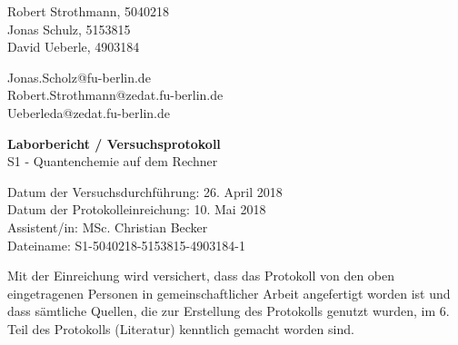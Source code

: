 %


%
\thispagestyle{empty}

\begin{flushleft}
Robert Strothmann, 5040218\\ 
Jonas Schulz, 5153815\\ 
David Ueberle, 4903184\\ 
\end{flushleft}
\vspace*{0.3cm}
Jonas.Scholz@fu-berlin.de\\
Robert.Strothmann@zedat.fu-berlin.de\\
Ueberleda@zedat.fu-berlin.de\\
\begin{center}
	\vspace*{1cm}
	\Large
	{ \bfseries Laborbericht / Versuchsprotokoll}\\
	\vspace*{1cm}
	{S1 - Quantenchemie auf dem Rechner}\\
\end{center}
	\vspace*{1cm}
	{Datum der Versuchsdurchführung: 26. April 2018}\\
	{Datum der Protokolleinreichung: 10. Mai 2018}\\
	{Assistent/in: MSc. Christian Becker}\\
	{Dateiname: S1-5040218-5153815-4903184-1}	
	\vfill
\begin{flushleft}
Mit der Einreichung wird versichert, dass das Protokoll von den oben eingetragenen Personen in gemeinschaftlicher Arbeit angefertigt worden ist und dass sämtliche Quellen, die zur Erstellung des Protokolls genutzt wurden, im 6. Teil des Protokolls (Literatur) kenntlich gemacht worden sind.
\end{flushleft}

\normalsize
\newpage
%
